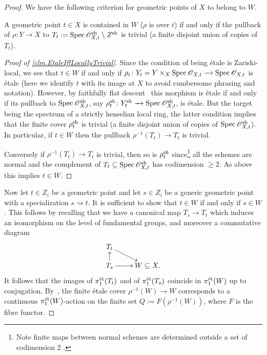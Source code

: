 \documentclass[12pt]{amsart}
\numberwithin{equation}{theorem}
\renewcommand{\:}{\colon}
\newcommand{\piet}{\pi_1^{\textnormal{\'{e}t}}} %
\theoremstyle{theorem}
\renewcommand{\O}{\mathscr O}
\begin{document}
\begin{proof}
We have the following criterion for geometric points of $X$ to belong to $W$.

\begin{claim} \label{clm.EtaleIffLocallyTrivial}
A geometric point $t \in X$ is contained in $W$ ($\rho$ is \etale{} over $t$) if and only if the pullback of $\rho\colon Y \to X$ to $T_t := \Spec \O_{X, t}^{\sh}\setminus Z^{\sh}$ is trivial (a finite disjoint union of copies of $T_t$).
\end{claim}

\begin{proof}[Proof of \autoref{clm.EtaleIffLocallyTrivial}]
Since the condition of being \'etale is Zariski-local, we see that $t \in W$ if and only if $\rho_{t}\colon Y_t = Y \times_{X} \Spec \O_{X,t} \to \Spec \O_{X,t}$ is \'etale (here we identify $t$ with its image at $X$ to avoid cumbersome phrasing and notation). However, by faithfully flat descent~\cite[Tag 02YJ, Lemma 34.20.29]{stacks-project} this morphism is \'etale if and only if its pullback to $\Spec \O_{X,t}^{\sh}$, say $\rho_t^{\sh}\colon Y_t^{\sh} \to \Spec \O_{X,t}^{\sh}$, is \'etale. But the target being the spectrum of a strictly henselian local ring, the latter condition implies that the finite \etale{} cover $\rho_t^{\textnormal{sh}}$ is trivial (\ie a finite disjoint union of copies of $\Spec \O_{X,t}^{\sh}$).
In particular, if $t \in W$ then the pullback $\rho^{-1}(T_t) \to T_t$ is trivial.

Conversely if $\rho^{-1}(T_t) \to T_t$ is trivial, then so is $\rho_t^{\textnormal{sh}}$ since\footnote{Note finite maps between normal schemes are determined outside a set of codimension 2 \cite{HartshorneGeneralizedDivisorsOnGorensteinSchemes}.} all the schemes are normal and the complement of $T_t \subseteq \Spec \O_{X,t}^{\sh}$ has codimension $\geq 2$.
As above this implies $t \in W$.
\end{proof}

Now let $t \in Z_i$ be a geometric point and let $s \in Z_i$ be a generic geometric point with a specialization $s \rightsquigarrow t$.
It is sufficient to show that $t \in W$ if and only if $s \in W$.
This follows by recalling that we have a canonical map $T_s \to T_t$ which induces an isomorphism on the level of fundamental groups, and moreover a commutative diagram
\[
\xymatrix@R=12pt{
T_t \ar[rd] \\
T_s \ar[u]\ar[r] & W \subseteq X. \\
}
\]
It follows that the images of $\piet(T_t)$ and of $\piet(T_s)$ coincide in $\piet(W)$ up to conjugation.
By~\cite[Chapter~I, Theorem~5.3]{MilneEtaleCohomology}, the finite \'etale cover $\rho^{-1}(W) \to W$ corresponds to a continuous $\piet(W)$-action on the finite set $Q := F(\rho^{-1}(W))$, where $F$ is the fibre functor.


\end{proof}
\end{document}
